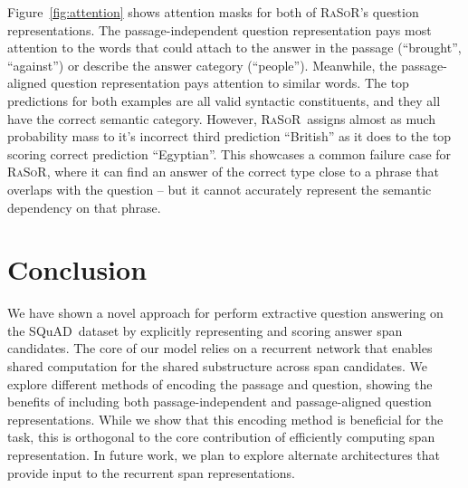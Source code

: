 \documentclass{article} \usepackage{iclr2017_conference,times}
\newcommand{\squad}{{\sc SQuAD}}
\newcommand{\ourmodel}{\textsc{RaSoR}}
\begin{document}
Figure~\ref{fig:attention} shows attention masks for both of \ourmodel's question representations.
The passage-independent question representation pays most attention to the words that could attach to the answer in the passage (``brought'', ``against'') or describe the answer category (``people'').
Meanwhile, the passage-aligned question representation pays attention to similar words.
The top predictions for both examples are all valid syntactic constituents, and they all have the correct semantic category. 
However, \ourmodel~assigns almost as much probability mass to it's incorrect third prediction ``British'' as it does to the top scoring correct prediction ``Egyptian''. 
This showcases a common failure case for \ourmodel, where it can find an answer of the correct type close to a phrase that overlaps with the question -- but it cannot accurately represent the semantic dependency on that phrase.
 \section{Conclusion}
We have shown a novel approach for perform extractive question answering on the \squad~dataset by explicitly representing and scoring answer span candidates.
The core of our model relies on a recurrent network that enables shared computation for the shared substructure across span candidates.
We explore different methods of encoding the passage and question, showing the benefits of including both passage-independent and passage-aligned question representations.
While we show that this encoding method is beneficial for the task, this is orthogonal to the core contribution of efficiently computing span representation.
In future work, we plan to explore alternate architectures that provide input to the recurrent span representations. 


\end{document}
